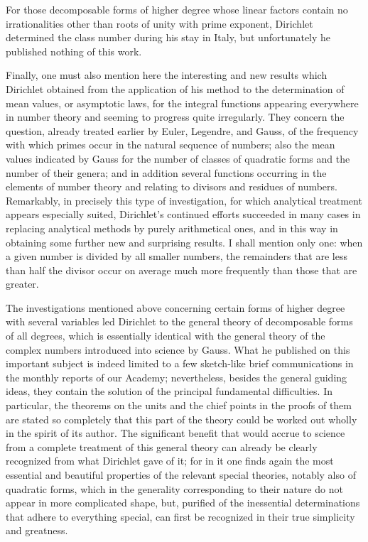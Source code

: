 \documentclass[11pt]{article}
\begin{document}
For those decomposable forms of higher degree whose linear factors contain no irrationalities other than roots of unity with prime exponent, Dirichlet determined the class number during his stay in Italy, but unfortunately he published nothing of this work.

Finally, one must also mention here the interesting and new results which Dirichlet obtained from the application of his method to the determination of mean values, or asymptotic laws, for the integral functions appearing everywhere in number theory and seeming to progress quite irregularly. They concern the question, already treated earlier by Euler, Legendre, and Gauss, of the frequency with which primes occur in the natural sequence of numbers; also the mean values indicated by Gauss for the number of classes of quadratic forms and the number of their genera; and in addition several functions occurring in the elements of number theory and relating to divisors and residues of numbers. Remarkably, in precisely this type of investigation, for which analytical treatment appears especially suited, Dirichlet's continued efforts succeeded in many cases in replacing analytical methods by purely arithmetical ones, and in this way in obtaining some further new and surprising results. I shall mention only one: when a given number is divided by all smaller numbers, the remainders that are less than half the divisor occur on average much more frequently than those that are greater.

The investigations mentioned above concerning certain forms of higher degree with several variables led Dirichlet to the general theory of decomposable forms of all degrees, which is essentially identical with the general theory of the complex numbers introduced into science by Gauss. What he published on this important subject is indeed limited to a few sketch-like brief communications in the monthly reports of our Academy; nevertheless, besides the general guiding ideas, they contain the solution of the principal fundamental difficulties. In particular, the theorems on the units and the chief points in the proofs of them are stated so completely that this part of the theory could be worked out wholly in the spirit of its author. The significant benefit that would accrue to science from a complete treatment of this general theory can already be clearly recognized from what Dirichlet gave of it; for in it one finds again the most essential and beautiful properties of the relevant special theories, notably also of quadratic forms, which in the generality corresponding to their nature do not appear in more complicated shape, but, purified of the inessential determinations that adhere to everything special, can first be recognized in their true simplicity and greatness.
\end{document}
